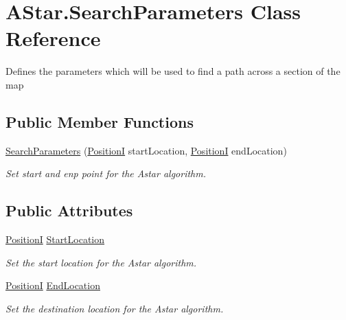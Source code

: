 \hypertarget{classAStar_1_1SearchParameters}{\section{A\-Star.\-Search\-Parameters Class Reference}
\label{classAStar_1_1SearchParameters}
}


Defines the parameters which will be used to find a path across a section of the map  


\subsection*{Public Member Functions}
\begin{DoxyCompactItemize}
\item 
\hyperlink{classAStar_1_1SearchParameters_a76adcad71c6cefd96023980515d8748e}{Search\-Parameters} (\hyperlink{classCore_1_1Models_1_1PositionI}{Position\-I} start\-Location, \hyperlink{classCore_1_1Models_1_1PositionI}{Position\-I} end\-Location)
\begin{DoxyCompactList}\small\item\em Set start and enp point for the Astar algorithm. \end{DoxyCompactList}\end{DoxyCompactItemize}
\subsection*{Public Attributes}
\begin{DoxyCompactItemize}
\item 
\hyperlink{classCore_1_1Models_1_1PositionI}{Position\-I} \hyperlink{classAStar_1_1SearchParameters_afaa7cfd59fcd28741a9d681b11d8e12d}{Start\-Location}
\begin{DoxyCompactList}\small\item\em Set the start location for the Astar algorithm. \end{DoxyCompactList}\item 
\hyperlink{classCore_1_1Models_1_1PositionI}{Position\-I} \hyperlink{classAStar_1_1SearchParameters_a0ca38d9161bb36da686500dee78f96a2}{End\-Location}
\begin{DoxyCompactList}\small\item\em Set the destination location for the Astar algorithm. \end{DoxyCompactList}\end{DoxyCompactItemize}


